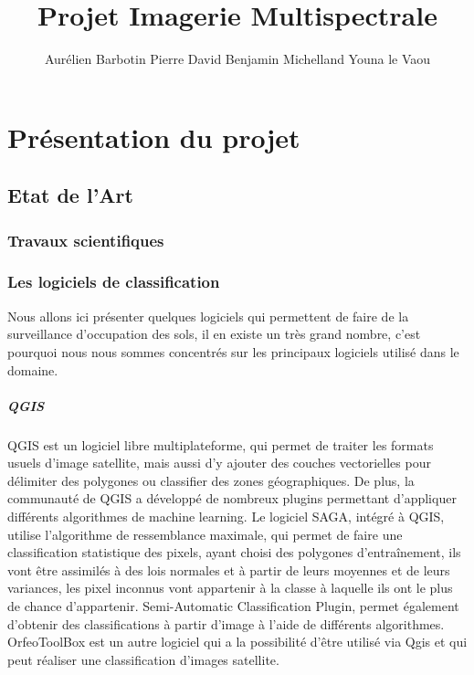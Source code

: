 \documentclass[a4paper,10pt]{report}
\begin{document}
\title{Projet Imagerie Multispectrale}
\author{Aurélien Barbotin Pierre David Benjamin Michelland Youna le Vaou}

\maketitle

\chapter{Présentation du projet}


\section{Etat de l'Art}
\subsection{Travaux scientifiques}

\subsection{Les logiciels de classification}
Nous allons ici présenter quelques logiciels qui permettent de faire de la surveillance d'occupation des sols, il en existe un très grand nombre, c'est pourquoi nous nous sommes concentrés sur les principaux logiciels utilisé dans le domaine.
\paragraph{QGIS}
\paragraph{}
QGIS est un logiciel libre multiplateforme, qui permet de traiter les formats usuels d'image satellite, mais aussi d'y ajouter des couches vectorielles pour délimiter des polygones ou classifier des zones géographiques.
De plus, la communauté de QGIS a développé de nombreux plugins permettant d'appliquer différents algorithmes de machine learning.\newline
Le logiciel SAGA, intégré à QGIS, utilise l'algorithme de ressemblance maximale, qui permet de faire une classification statistique des pixels, ayant choisi des polygones d’entraînement, ils vont être assimilés à des lois normales et à partir de leurs moyennes et de leurs variances, les pixel inconnus vont appartenir à la classe à laquelle ils ont le plus de chance d'appartenir.
Semi-Automatic Classification Plugin, permet également d'obtenir des classifications à partir d'image à l'aide de différents algorithmes.
OrfeoToolBox est un autre logiciel qui a la possibilité d'être utilisé via Qgis et qui peut réaliser une classification d'images satellite.
\end{document}
